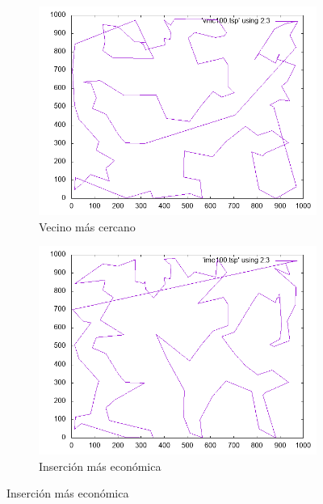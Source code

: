 \documentclass[12pt,spanish]{article}
\begin{document}
\begin{figure}[H]
\centering
\begin{subfigure}[b]{0.36\textwidth}
\includegraphics[width=\textwidth]{rd100_vmc.png}
\caption{Vecino más cercano}
\end{subfigure}
\quad
\begin{subfigure}[b]{0.36\textwidth}
\includegraphics[width=\textwidth]{rd100_ime.png}
\caption{Inserción más económica}
\end{subfigure}

\vspace{1cm}


\end{figure}
\end{document}

